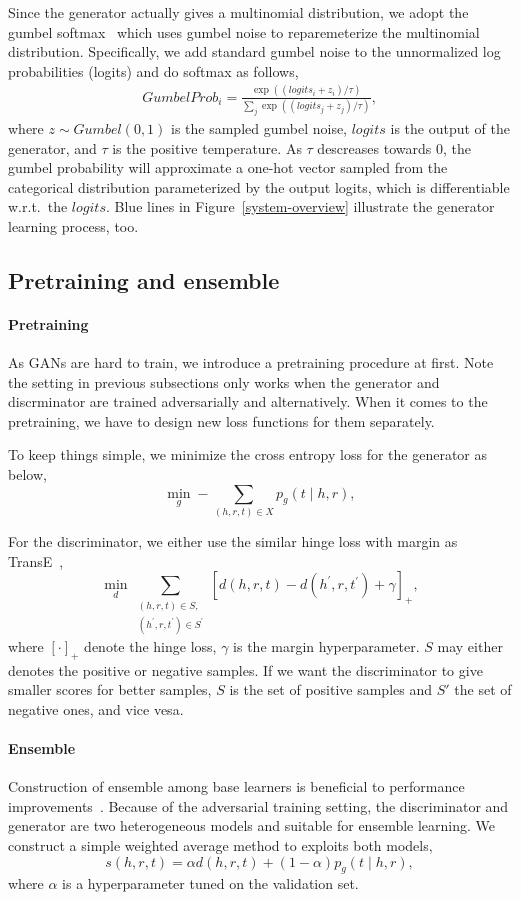 \documentclass[twocolumn,a4paper,10pt,review,5p]{elsarticle}
\begin{document}
Since the generator actually gives a multinomial distribution, we adopt the gumbel softmax~\cite{GumbelSoftmax_Jiang_2016} which uses gumbel noise to reparemeterize the multinomial distribution. Specifically, we add standard gumbel noise to the unnormalized log probabilities (logits) and do softmax as follows,
\begin{align*}
    GumbelProb_i = \frac{\exp((logits_i + z_i)/ \tau)}{\sum_{j}\exp((logits_j + z_j)/ \tau)},
\end{align*}
where $z \sim Gumbel(0, 1)$ is the sampled gumbel noise, $logits$ is the output of the generator, and $\tau$ is the positive temperature. As $\tau$ descreases towards 0, the gumbel probability will approximate a one-hot vector sampled from the categorical distribution parameterized by the output logits, which is differentiable w.r.t.\ the $logits$. Blue lines in Figure~\ref{system-overview} illustrate the generator learning process, too.


\subsection{Pretraining and ensemble}

\paragraph{Pretraining} As GANs are hard to train, we introduce a pretraining procedure at first. Note the setting in previous subsections only works when the generator and discrminator are trained adversarially and alternatively. When it comes to the pretraining, we have to design new loss functions for them separately.

To keep things simple, we minimize the cross entropy loss for the generator as below,
\[
    \min_g -\sum_{(h, r, t)\in X} p_g(t \mid h, r),
\]

For the discriminator, we either use the similar hinge loss with margin as TransE~\cite{TransE2013},
\[
    \min_d \sum_{\substack{(h, r, t)\in S,\\ (h^\prime, r, t^\prime)\in S^\prime }}
        {[ d(h, r, t) - d(h^\prime, r, t^\prime) + \gamma ]}_+,
\]
where ${[\cdot]}_+$ denote the hinge loss, $\gamma$ is the margin hyperparameter. $S$ may either denotes the positive or negative samples. If we want the discriminator to give smaller scores for better samples, $S$ is the set of positive samples and $S'$ the set of negative ones, and vice vesa.

\paragraph{Ensemble} Construction of ensemble among base learners is beneficial to performance improvements~\cite{dietterich2000ensemble}. Because of the adversarial training setting, the discriminator and generator are two heterogeneous models and suitable for ensemble learning. We construct a simple weighted average method to exploits both models,
\[
    s(h, r, t) = \alpha d(h, r, t) + (1 - \alpha) p_g(t \mid h, r),
\]
where $\alpha$ is a hyperparameter tuned on the validation set.
\end{document}
